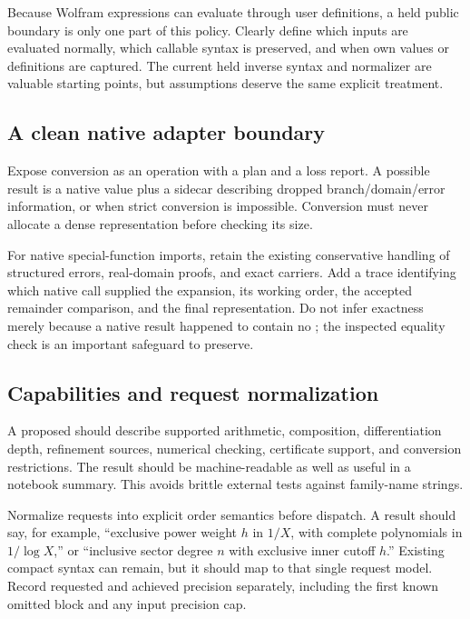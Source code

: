 \documentclass[11pt,a4paper]{article}
\newcommand{\code}[1]{\texttt{\detokenize{#1}}}
\theoremstyle{remark}\newtheorem{remark}[proposition]{Remark}
\begin{document}
Because Wolfram expressions can evaluate through user definitions, a held public boundary is only one part of this policy. Clearly define which inputs are evaluated normally, which callable syntax is preserved, and when own values or definitions are captured. The current held inverse syntax and normalizer are valuable starting points, but assumptions deserve the same explicit treatment.\cite{arithmetic,inverseexpressions}

\subsection{A clean native adapter boundary}
Expose conversion as an operation with a plan and a loss report. A possible result is a native value plus a sidecar describing dropped branch/domain/error information, or \code{Missing} when strict conversion is impossible. Conversion must never allocate a dense representation before checking its size.

For native special-function imports, retain the existing conservative handling of structured errors, real-domain proofs, and exact carriers. Add a trace identifying which native call supplied the expansion, its working order, the accepted remainder comparison, and the final representation. Do not infer exactness merely because a native result happened to contain no \code{SeriesData}; the inspected equality check is an important safeguard to preserve.\cite{native}

\subsection{Capabilities and request normalization}
A proposed \code{SeriesCapabilities[s]} should describe supported arithmetic, composition, differentiation depth, refinement sources, numerical checking, certificate support, and conversion restrictions. The result should be machine-readable as well as useful in a notebook summary. This avoids brittle external tests against family-name strings.

Normalize requests into explicit order semantics before dispatch. A result should say, for example, ``exclusive power weight $h$ in $1/X$, with complete polynomials in $1/\log X$,'' or ``inclusive sector degree $n$ with exclusive inner cutoff $h$.'' Existing compact syntax can remain, but it should map to that single request model. Record requested and achieved precision separately, including the first known omitted block and any input precision cap.
\end{document}
